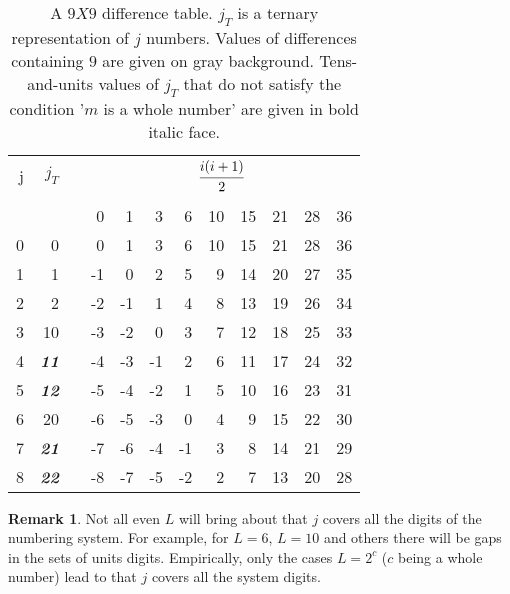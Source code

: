 \documentclass[12pt, twoside, leqno]{article}
\theoremstyle{definition}
\newtheorem{rem}[thm]{Remark}
\numberwithin{equation}{section}
\begin{document}
\begin{table}[htb]
  \centering
  \caption{A $9X9$ difference table. $j_T$ is a ternary representation of $j$ numbers. Values of differences containing $9$ are given on gray background. Tens-and-units values of $j_T$ that do not satisfy the condition '$m$ is a whole number' are given in bold italic face.}
    \begin{tabular}{rrrrrrrrrrrr}
    \hline
    j& $j_T$&&\multicolumn{9}{c}{$\cfrac{i(i +1)}{2}$}\\ \cline{4-12} \\
     &     &   & 0     & 1     & 3     & 6     & 10    & 15    & 21    & 28 & 36  \\
    \hline
    0 & 0  &   & \cellcolor{lightgray}0     & 1     & 3     & 6     & 10    & 15    & 21    & 28 & \cellcolor{lightgray}36 \\
    1 & 1  &   & -1    & \cellcolor{lightgray}0     & 2     & 5     & \cellcolor{lightgray}9     & 14    & 20    & 27 & 35 \\
    2 & 2  &   & -2    & -1    & 1     & 4     & 8     & 13    & 19    & 26 & 34 \\
    3 & 10 &   & -3    & -2    & \cellcolor{lightgray}0     & 3     & 7     & 12    & \cellcolor{lightgray}18    & 25 & 33 \\
    4 & \textbf{\textit{11}} &   & -4    & -3    & -1    & 2     & 6     & 11    & 17    & 24 & 32 \\
    5 & \textbf{\textit{12}} &   & -5    & -4    & -2    & 1     & 5     & 10    & 16    & 23 & 31 \\
    6 & 20 &   & -6    & -5    & -3    & \cellcolor{lightgray}0     & 4     & \cellcolor{lightgray}9     & 15    & 22 & 30 \\
    7 & \textbf{\textit{21}} &   & -7    & -6    & -4    & -1    & 3     & 8     & 14    & 21 & 29 \\
    8 & \textbf{\textit{22}} &   & -8    & -7    & -5    & -2    & 2     & 7     & 13    & 20 & 28 \\
    \hline
    \end{tabular}%
  \label{tab:4}%
\end{table}%

\begin{rem}
Not all even $L$ will bring about that $j$ covers all the digits of the numbering system. For example, for $L = 6$, $L = 10$ and others there will be gaps in the sets of units digits. Empirically, only the cases $L = 2^c$ ($c$ being a whole number) lead to that $j$ covers all the system digits.
\end{rem}
\end{document}
